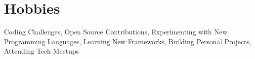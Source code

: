 
\section{Hobbies}
\resumeSubHeadingListStart
\small{
    \item{Coding Challenges, Open Source Contributions, Experimenting with New Programming Languages, Learning New Frameworks, Building Personal Projects, Attending Tech Meetups}
}
\resumeSubHeadingListEnd
